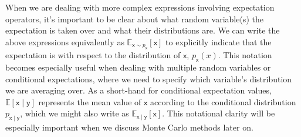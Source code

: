 When we are dealing with more complex expressions involving expectation operators, it's important to be clear about what random variable(s) the expectation is taken over and what their distributions are. We can write the above expressions equivalently as $\mathbb{E}_{\mathsf{x} \sim p_{\mathsf{x}}}[\mathsf{x}]$ to explicitly indicate that the expectation is with respect to the distribution of $\mathsf{x}$, $p_{\mathsf{x}}(x)$. This notation becomes especially useful when dealing with multiple random variables or conditional expectations, where we need to specify which variable's distribution we are averaging over. As a short-hand for conditional expectation values, $\mathbb{E}[\mathsf{x} \mid \mathsf{y}]$ represents the mean value of $\mathsf{x}$ according to the conditional distribution $p_{\mathsf{x}\mid \mathsf{y}}$, which we might also write as $\mathbb{E}_{\mathsf{x} \mid \mathsf{y}}[\mathsf{x}]$. This notational clarity will be especially important when we discuss Monte Carlo methods later on.


